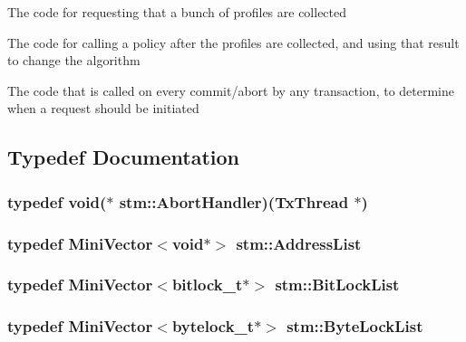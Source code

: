 \begin{DoxyItemize}
\item The code for requesting that a bunch of profiles are collected
\item The code for calling a policy after the profiles are collected, and using that result to change the algorithm
\item The code that is called on every commit/abort by any transaction, to determine when a request should be initiated 
\end{DoxyItemize}

\subsection{Typedef Documentation}
\hypertarget{namespacestm_a8c4b0bd094cade5163014a1f0a17d4cd}{
\subsubsection[{Abort\-Handler}]{\setlength{\rightskip}{0pt plus 5cm}typedef void($\ast$ stm\-::\-Abort\-Handler)({\bf Tx\-Thread} $\ast$)}}\label{namespacestm_a8c4b0bd094cade5163014a1f0a17d4cd}
\hypertarget{namespacestm_a1f450babd9df052917264e0e0705e90b}{
\subsubsection[{Address\-List}]{\setlength{\rightskip}{0pt plus 5cm}typedef {\bf Mini\-Vector}$<$void$\ast$$>$ stm\-::\-Address\-List}}\label{namespacestm_a1f450babd9df052917264e0e0705e90b}
\hypertarget{namespacestm_ab4b8c3282dc3d14aded2b969e07b5213}{
\subsubsection[{Bit\-Lock\-List}]{\setlength{\rightskip}{0pt plus 5cm}typedef {\bf Mini\-Vector}$<${\bf bitlock\-\_\-t}$\ast$$>$ stm\-::\-Bit\-Lock\-List}}\label{namespacestm_ab4b8c3282dc3d14aded2b969e07b5213}
\hypertarget{namespacestm_adde267538d3124b2b405e5bc9d1135f4}{
\subsubsection[{Byte\-Lock\-List}]{\setlength{\rightskip}{0pt plus 5cm}typedef {\bf Mini\-Vector}$<${\bf bytelock\-\_\-t}$\ast$$>$ stm\-::\-Byte\-Lock\-List}}\label{namespacestm_adde267538d3124b2b405e5bc9d1135f4}
